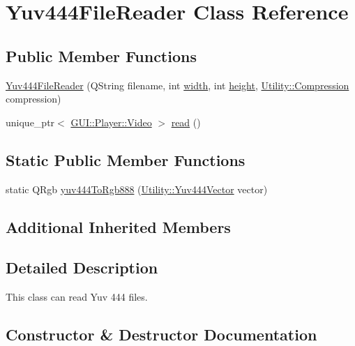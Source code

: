 \hypertarget{classUtility_1_1Yuv444FileReader}{}\section{Yuv444\+File\+Reader Class Reference}
\label{classUtility_1_1Yuv444FileReader}
\subsection*{Public Member Functions}
\begin{DoxyCompactItemize}
\item 
\hyperlink{classUtility_1_1Yuv444FileReader_ac46c1b5839e838d4a3ac247434d32876}{Yuv444\+File\+Reader} (Q\+String filename, int \hyperlink{classUtility_1_1YuvFileReader_a2474a5474cbff19523a51eb1de01cda4}{width}, int \hyperlink{classUtility_1_1YuvFileReader_ad12fc34ce789bce6c8a05d8a17138534}{height}, \hyperlink{namespaceUtility_a56a83bf6847f4801f4205eb4be237ccf}{Utility\+::\+Compression} compression)
\item 
unique\+\_\+ptr$<$ \hyperlink{classGUI_1_1Player_1_1Video}{G\+U\+I\+::\+Player\+::\+Video} $>$ \hyperlink{classUtility_1_1Yuv444FileReader_a9dd03728ebb2e883f5cac8cb357fcd0e}{read} ()
\end{DoxyCompactItemize}
\subsection*{Static Public Member Functions}
\begin{DoxyCompactItemize}
\item 
static Q\+Rgb \hyperlink{classUtility_1_1Yuv444FileReader_a29eb09c0726c18a7a91c90ac5e92a1cb}{yuv444\+To\+Rgb888} (\hyperlink{classUtility_1_1Yuv444Vector}{Utility\+::\+Yuv444\+Vector} vector)
\end{DoxyCompactItemize}
\subsection*{Additional Inherited Members}


\subsection{Detailed Description}
This class can read Yuv 444 files. 

\subsection{Constructor \& Destructor Documentation}
\hypertarget{classUtility_1_1Yuv444FileReader_ac46c1b5839e838d4a3ac247434d32876}{}
